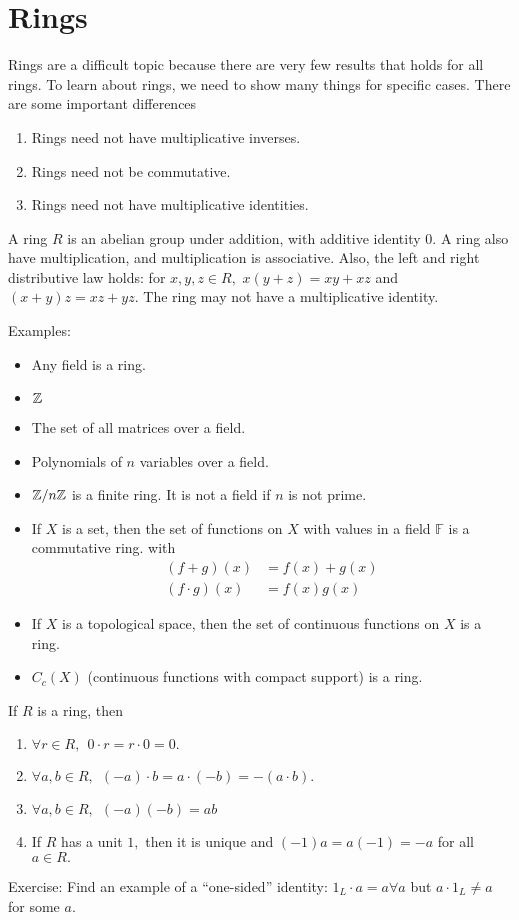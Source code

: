 \documentclass[a4paper]{article}
\begin{document}
\section{Rings}
Rings are a difficult topic because there are very few results that holds for all rings. To learn about rings, we need to show many things for specific cases. There are some important differences \begin{enumerate}
    \item Rings need not have multiplicative inverses.
    \item Rings need not be commutative.
    \item Rings need not have multiplicative identities.
\end{enumerate}
\begin{definition}[Ring]
    A ring $R$ is an abelian group under addition, with additive identity $0.$ A ring also have multiplication, and multiplication is associative. Also, the left and right distributive law holds: for $x,y,z\in R,$ $x(y+z)=xy+xz$ and $(x+y)z=xz+yz.$
    The ring may not have a multiplicative identity. 
\end{definition}
Examples:\begin{itemize}
    \item Any field is a ring.
    \item $\mathbb{Z}$
    \item The set of all matrices over a field.
    \item Polynomials of $n$ variables over a field.
    \item $\mathbb{Z}/n\mathbb{Z}$ is a finite ring. It is not a field if $n$ is not prime.
    \item If $X$ is a set, then the set of functions on $X$ with values in a field $\mathbb F$ is a commutative ring. with \begin{align}
        (f+g)(x)&=f(x)+g(x)\\
        (f\cdot g)(x)&=f(x)g(x)
    \end{align}
    \item If $X$ is a topological space, then the set of continuous functions on $X$ is a ring.
    \item $C_c(X)$ (continuous functions with compact support) is a ring.
\end{itemize}

If $R$ is a ring, then \begin{enumerate}
    \item $\forall r\in R,~~0\cdot r=r\cdot 0=0.$
    \item $\forall a,b\in R,~~(-a)\cdot b=a\cdot (-b)=-(a\cdot b).$
    \item $\forall a,b\in R,~~(-a)(-b)=ab$
    \item If $R$ has a unit $1,$ then it is unique and $(-1)a=a(-1)=-a$ for all $a\in R.$
\end{enumerate}
Exercise: Find an example of a ``one-sided'' identity: $1_L\cdot a=a\forall a$ but $a\cdot 1_L\neq a$ for some $a.$
\end{document}
